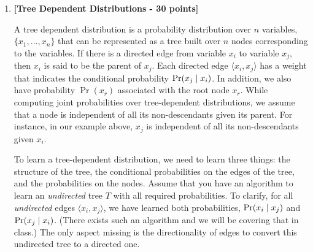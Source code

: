 \begin{enumerate}
\begin{enumerate}
\item{\bf [10 points]}
Assume that your task is to predict the value of $x_0$ given an assignment to
the other $n$ variables and that you have the parameters of the model.  Show
how to use these parameters to predict $x_0$.  ({\it Hint:} Consider the ratio
between $P(X_0=0)$ and $P(X_0=1)$.)

\item{\bf [10 points]}
Show that the decision surface for this prediction is a linear function of
the $x_i$'s.
\end{enumerate}





    \item {\bf [Tree Dependent Distributions - 30 points]}



      A tree dependent distribution is a probability distribution over $n$
      variables, $\{x_1,\ldots,x_n\}$ that can be represented as a tree built
      over $n$ nodes corresponding to the variables. If there is a directed edge
      from variable $x_i$ to variable $x_j$, then $x_i$ is said to be the parent
      of $x_j$. Each directed edge $\langle x_i, x_j\rangle$ has a weight that
      indicates the conditional probability $\Pr(x_j \;|\; x_i)$. In addition,
      we also have probability $\Pr(x_r)$ associated with the root node $x_r$.
      While computing joint probabilities over tree-dependent distributions, we
      assume that a node is independent of all its non-descendants given its
      parent. For instance, in our example above, $x_j$ is independent of all its
      non-descendants given $x_i$.

      To learn a tree-dependent distribution, we need to learn three things: the
      structure of the tree, the conditional probabilities on the edges of the tree, and the
      probabilities on the nodes.  Assume that you have an algorithm to learn an
      {\em undirected} tree $T$ with all required probabilities. To clarify, for
      all {\em undirected} edges $\langle x_i, x_j\rangle$, we have learned both
      probabilities, $\Pr(x_i \;|\; x_j)$ and $\Pr(x_j \;|\; x_i)$.
      (There exists such an algorithm and we will be covering that in class.) The
      only aspect missing is the directionality of edges to convert this
      undirected tree to a directed one.


\end{enumerate}
